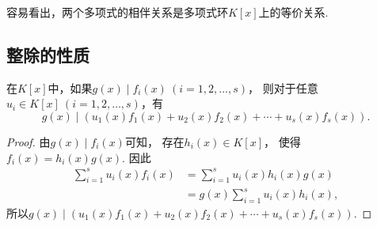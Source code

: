 容易看出，两个多项式的相伴关系是多项式环\(K[x]\)上的等价关系.

\subsection{整除的性质}
\begin{proposition}\label{theorem:多项式.整除的线性性}
在\(K[x]\)中，如果\(g(x) \mid f_i(x)\ (i=1,2,\dotsc,s)\)，
则对于任意\(u_i \in K[x]\ (i=1,2,\dotsc,s)\)，有\begin{equation*}
	g(x) \mid (u_1(x) f_1(x) + u_2(x) f_2(x) + \dotsb + u_s(x) f_s(x)).
\end{equation*}
\begin{proof}
由\(g(x) \mid f_i(x)\)可知，
存在\(h_i(x) \in K[x]\)，
使得\(f_i(x) = h_i(x) g(x)\).
因此\begin{align*}
	\sum_{i=1}^s u_i(x) f_i(x)
	&= \sum_{i=1}^s u_i(x) h_i(x) g(x) \\
	&= g(x) \sum_{i=1}^s u_i(x) h_i(x),
\end{align*}
所以\(g(x) \mid (u_1(x) f_1(x) + u_2(x) f_2(x) + \dotsb + u_s(x) f_s(x))\).
\end{proof}
\end{proposition}

